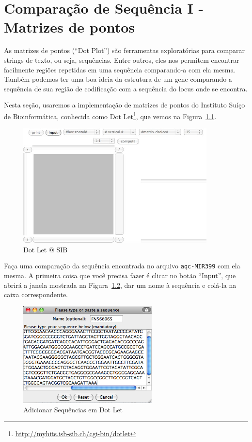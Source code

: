 \documentclass[letter,11pt]{book}
\begin{document}
\chapter{Comparação de Sequência I - Matrizes de pontos}

As matrizes de pontos (``Dot Plot'') são ferramentas exploratórias para comparar strings de texto, ou seja, sequências. Entre outros, eles nos permitem encontrar facilmente regiões repetidas em uma sequência comparando-a com ela mesma. Também podemos ter uma boa ideia da estrutura de um gene comparando a sequência de sua região de codificação com a sequência do locus onde se encontra.

Nesta seção, usaremos a implementação de matrizes de pontos do Instituto Suíço de Bioinformática, conhecida como Dot Let\footnote{\url{http://myhits.isb-sib.ch/cgi-bin/dotlet}}, que vemos na Figura~\ref{DotLet1}.

\begin{figure}[ht]
\centering
   \includegraphics[width=10cm]{Figs/DotLet1.png}
  \caption{\label{DotLet1}Dot Let @ SIB}
\end{figure}

Faça uma comparação da sequência encontrada no arquivo \Verb+aqc-MIR399+ com ela mesma. A primeira coisa que você precisa fazer é clicar no botão ``Input'', que abrirá a janela mostrada na Figura~\ref{inputDotLet}, dar um nome à sequência e colá-la na caixa correspondente.

\begin{figure}[ht]
\centering
   \includegraphics[width=7cm]{Figs/inputDotLet.png}
  \caption{\label{inputDotLet}Adicionar Sequências em Dot Let}
\end{figure}
\end{document}
